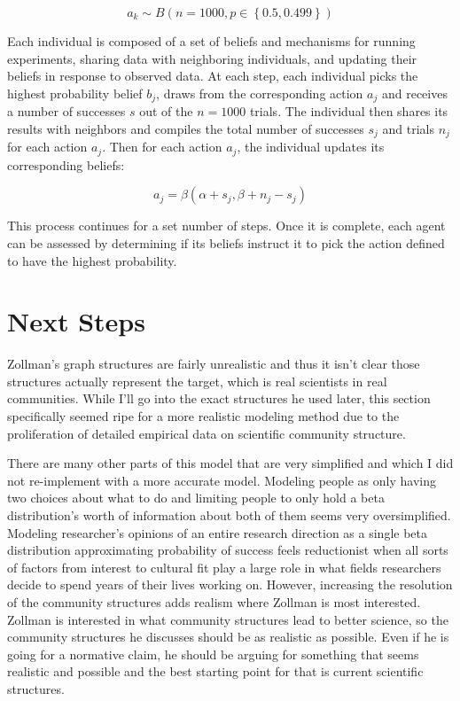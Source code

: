 \[a_k \sim B\left(n = 1000, p \in \left\{0.5, 0.499 \right\}\right)\]

Each individual is composed of a set of beliefs and mechanisms for
running experiments, sharing data with neighboring individuals, and
updating their beliefs in response to observed data. At each step, each
individual picks the highest probability belief \(b_j\), draws from the
corresponding action \(a_j\) and receives a number of successes \(s\)
out of the \(n = 1000\) trials. The individual then shares its results
with neighbors and compiles the total number of successes \(s_j\) and
trials \(n_j\) for each action \(a_j\). Then for each action \(a_j\),
the individual updates its corresponding beliefs:

\[a_j = \beta(\alpha + s_j, \beta + n_j - s_j)\]

This process continues for a set number of steps. Once it is complete,
each agent can be assessed by determining if its beliefs instruct it to
pick the action defined to have the highest probability.

\hypertarget{next-steps}{%
\section{Next Steps}\label{next-steps}}

Zollman's graph structures are fairly unrealistic and thus it isn't
clear those structures actually represent the target, which is real
scientists in real communities. While I'll go into the exact structures
he used later, this section specifically seemed ripe for a more
realistic modeling method due to the proliferation of detailed empirical
data on scientific community structure.

There are many other parts of this model that are very simplified and
which I did not re-implement with a more accurate model. Modeling people
as only having two choices about what to do and limiting people to only
hold a beta distribution's worth of information about both of them seems
very oversimplified. Modeling researcher's opinions of an entire
research direction as a single beta distribution approximating
probability of success feels reductionist when all sorts of factors from
interest to cultural fit play a large role in what fields researchers
decide to spend years of their lives working on. However, increasing the
resolution of the community structures adds realism where Zollman is
most interested. Zollman is interested in what community structures lead
to better science, so the community structures he discusses should be as
realistic as possible. Even if he is going for a normative claim, he
should be arguing for something that seems realistic and possible and
the best starting point for that is current scientific structures.
